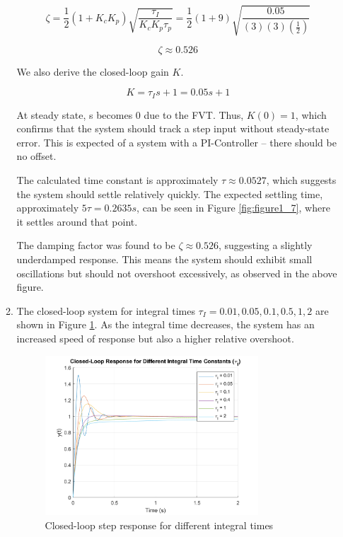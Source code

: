 \documentclass[12pt]{article}
\begin{document}
\begin{enumerate}
\begin{enumerate}
    \[
    \zeta = \frac{1}{2} (1 + K_c K_p) \sqrt{\frac{\tau_I}{K_c K_p \tau_p}}
 = \frac{1}{2} (1 + 9) \sqrt{\frac{0.05}{(3)(3)(\frac{1}{2})}}
    \]

    \[
    \zeta \approx 0.526
    \]

    We also derive the closed-loop gain \( K \).

    \[
    K = \tau_I s + 1 = 0.05s + 1
    \]

    At steady state, s becomes 0 due to the FVT. Thus, \( K(0) = 1 \), which confirms that the system should track a step input without steady-state error. This is expected of a system with a PI-Controller -- there should be no offset.\linebreak

    The calculated time constant is approximately \( \tau \approx 0.0527 \), which suggests the system should settle relatively quickly. The expected settling time, approximately \( 5\tau = 0.2635s \), can be seen in Figure \ref{fig:figure1_7}, where it settles around that point. \linebreak

    The damping factor was found to be \( \zeta \approx 0.526 \), suggesting a slightly underdamped response. This means the system should exhibit small oscillations but should not overshoot excessively, as observed in the above figure. \linebreak

    \pagebreak

    \item
    The closed-loop system for integral times \( \tau_I = {0.01, 0.05, 0.1, 0.5, 1, 2} \) are shown in Figure \ref{fig:figure1_8}. As the integral time decreases, the system has an increased speed of response but also a higher relative overshoot.

    \begin{figure}[H]
      \centering
      \includegraphics[width=0.8\textwidth]{Figures/figure1_9.png}
      \caption{Closed-loop step response for different integral times}
      \label{fig:figure1_8}
    \end{figure}


\end{enumerate}
\end{enumerate}
\end{document}
